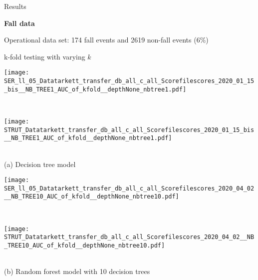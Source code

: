 \begin{frame}{Results}

\centering
\textbf{Fall data}

Operational data set: 174 fall events and 2619 non-fall events (6\%)

k-fold testing with varying $k$

\vspace{-0.2cm}
\renewcommand{\ratio}{0.65}
    \begin{minipage}[t]{0.49\linewidth}\vspace{0pt}
        \centering
        \begin{minipage}[t]{\ratio\linewidth}\vspace{0pt}
        \centerline{\texttt{[image: SER\_ll\_05\_Datatarkett\_transfer\_db\_all\_c\_all\_Scorefilescores\_2020\_01\_15\_bis\_\_NB\_TREE1\_AUC\_of\_kfold\_\_depthNone\_nbtree1.pdf]}}
        \end{minipage}\\
        \begin{minipage}[t]{\ratio\linewidth}\vspace{0cm}
        \centerline{\texttt{[image: STRUT\_Datatarkett\_transfer\_db\_all\_c\_all\_Scorefilescores\_2020\_01\_15\_bis\_\_NB\_TREE1\_AUC\_of\_kfold\_\_depthNone\_nbtree1.pdf]}}
        \end{minipage}\\
        {\small(a)\; Decision tree model}
    \end{minipage}
    \begin{minipage}[t]{0.49\linewidth}\vspace{0pt}
        \centering
        \begin{minipage}[t]{\ratio\linewidth}\vspace{0pt}
        \centerline{\texttt{[image: SER\_ll\_05\_Datatarkett\_transfer\_db\_all\_c\_all\_Scorefilescores\_2020\_04\_02\_\_NB\_TREE10\_AUC\_of\_kfold\_\_depthNone\_nbtree10.pdf]}}
        \end{minipage}\\
        \begin{minipage}[t]{\ratio\linewidth}\vspace{0cm}
        \centerline{\texttt{[image: STRUT\_Datatarkett\_transfer\_db\_all\_c\_all\_Scorefilescores\_2020\_04\_02\_\_NB\_TREE10\_AUC\_of\_kfold\_\_depthNone\_nbtree10.pdf]}}
        \end{minipage}\\
        {\small(b)\; Random forest model with 10 decision trees}
    \end{minipage}

\end{frame}

